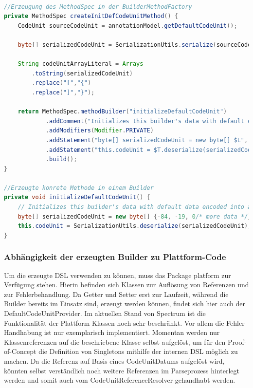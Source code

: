 \documentclass[12pt,oneside,a4paper,parskip]{scrbook}
\begin{document}
\begin{lstlisting}[label=lst:defcu,
language=java,
firstnumber=1,
caption=Quelltext zur Erzeugung des MethodSpecs für die Builder-Methode initializeDefaultCodeUnit und die daraus resultierende konrekte Methode in einem Builder.]

//Erzeugung des MethodSpec in der BuilderMethodFactory
private MethodSpec createInitDefCodeUnitMethod() {
	CodeUnit sourceCodeUnit = annotationModel.getDefaultCodeUnit();

	byte[] serializedCodeUnit = SerializationUtils.serialize(sourceCodeUnit);

	String codeUnitArrayLiteral = Arrays
		.toString(serializedCodeUnit)
		.replace("[","{")
		.replace("]","}");

	return MethodSpec.methodBuilder("initializeDefaultCodeUnit")
			.addComment("Initializes this builder's data with default data encoded into a byte[]")
			.addModifiers(Modifier.PRIVATE)
			.addStatement("byte[] serializedCodeUnit = new byte[] $L", codeUnitArrayLiteral)
			.addStatement("this.codeUnit = $T.deserialize(serializedCodeUnit)", SerializationUtils.class)
			.build();
}

//Erzeugte konrete Methode in einem Builder
private void initializeDefaultCodeUnit() {
	// Initializes this builder's data with default data encoded into a byte[]
	byte[] serializedCodeUnit = new byte[] {-84, -19, 0/* more data */};
	this.codeUnit = SerializationUtils.deserialize(serializedCodeUnit);
}
\end{lstlisting}

\subsubsection{Abhängigkeit der erzeugten Builder zu Plattform-Code}\label{sec:plattform}

Um die erzeugte DSL verwenden zu können, muss das Package platform zur Verfügung stehen. Hierin befinden sich Klassen zur Auflösung von Referenzen und zur Fehlerbehandlung. Da Getter und Setter erst zur Laufzeit, während die Builder bereits im Einsatz sind, erzeugt werden können, findet sich hier auch der DefaultCodeUnitProvider. Im aktuellen Stand von Spectrum ist die Funktionalität der Plattform Klassen noch sehr beschränkt. Vor allem die Fehler Handhabung ist nur exemplarisch implementiert. Momentan werden nur Klassenreferenzen auf die beschriebene Klasse selbst aufgelöst, um für den Proof-of-Concept die Definition von Singletons mithilfe der internen DSL möglich zu machen. Da die Referenz auf Basis eines CodeUnitDatums aufgelöst wird, könnten selbst verständlich noch weitere Referenzen im Parseprozess hinterlegt werden und somit auch vom CodeUnitReferenceResolver gehandhabt werden.
\end{document}
